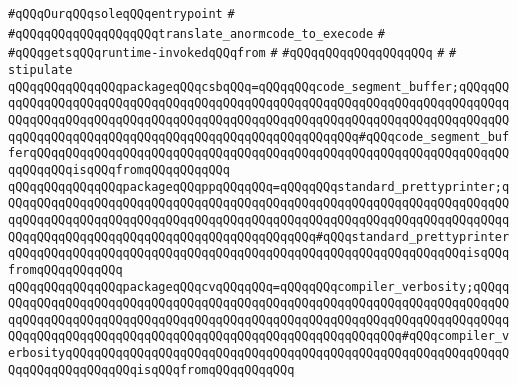 \newline
\verb|#qQQqOurqQQqsoleqQQqentrypoint|\newline
\verb|#|\newline
\verb|#qQQqqQQqqQQqqQQqqQQqtranslate_anormcode_to_execode|\newline
\verb|#|\newline
\verb|#qQQqgetsqQQqruntime-invokedqQQqfrom|\newline
\verb|#|\newline
\verb|#qQQqqQQqqQQqqQQqqQQq|\newline
\verb|#|\newline
\verb|#|\newline
\newline
\verb|stipulate|\newline
\verb|qQQqqQQqqQQqqQQqpackageqQQqcsbqQQq=qQQqqQQqcode_segment_buffer;qQQqqQQqqQQqqQQqqQQqqQQqqQQqqQQqqQQqqQQqqQQqqQQqqQQqqQQqqQQqqQQqqQQqqQQqqQQqqQQqqQQqqQQqqQQqqQQqqQQqqQQqqQQqqQQqqQQqqQQqqQQqqQQqqQQqqQQqqQQqqQQqqQQqqQQqqQQqqQQqqQQqqQQqqQQqqQQqqQQqqQQqqQQqqQQqqQQq#qQQqcode_segment_bufferqQQqqQQqqQQqqQQqqQQqqQQqqQQqqQQqqQQqqQQqqQQqqQQqqQQqqQQqqQQqqQQqqQQqqQQqqQQqisqQQqfromqQQqqQQqqQQq|\newline
\verb|qQQqqQQqqQQqqQQqpackageqQQqppqQQqqQQq=qQQqqQQqstandard_prettyprinter;qQQqqQQqqQQqqQQqqQQqqQQqqQQqqQQqqQQqqQQqqQQqqQQqqQQqqQQqqQQqqQQqqQQqqQQqqQQqqQQqqQQqqQQqqQQqqQQqqQQqqQQqqQQqqQQqqQQqqQQqqQQqqQQqqQQqqQQqqQQqqQQqqQQqqQQqqQQqqQQqqQQqqQQqqQQqqQQqqQQqqQQq#qQQqstandard_prettyprinterqQQqqQQqqQQqqQQqqQQqqQQqqQQqqQQqqQQqqQQqqQQqqQQqqQQqqQQqqQQqqQQqisqQQqfromqQQqqQQqqQQq|\newline
\verb|qQQqqQQqqQQqqQQqpackageqQQqcvqQQqqQQq=qQQqqQQqcompiler_verbosity;qQQqqQQqqQQqqQQqqQQqqQQqqQQqqQQqqQQqqQQqqQQqqQQqqQQqqQQqqQQqqQQqqQQqqQQqqQQqqQQqqQQqqQQqqQQqqQQqqQQqqQQqqQQqqQQqqQQqqQQqqQQqqQQqqQQqqQQqqQQqqQQqqQQqqQQqqQQqqQQqqQQqqQQqqQQqqQQqqQQqqQQqqQQqqQQqqQQqqQQq#qQQqcompiler_verbosityqQQqqQQqqQQqqQQqqQQqqQQqqQQqqQQqqQQqqQQqqQQqqQQqqQQqqQQqqQQqqQQqqQQqqQQqqQQqqQQqisqQQqfromqQQqqQQqqQQq|\newline
